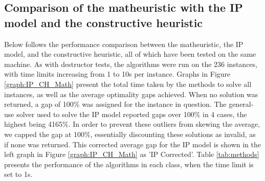 \documentclass[preprint,11pt,3p]{elsarticle}
\begin{document}
\subsection{Comparison of the matheuristic with the IP model and the constructive heuristic}
Below follows the performance comparison between the matheuristic, the IP model, and the constructive heuristic, all of which have been tested on the same machine. As with destructor tests, the algorithms were run on the 236 instances, with time limits increasing from 1 to 10s per instance. Graphs in Figure \ref{graph:IP_CH_Math} present the total time taken by the methods to solve all instances, as well as the average optimality gaps achieved. When no solution was returned, a gap of 100\% was assigned for the instance in question. The general-use solver used to solve the IP model reported gaps over 100\% in 4 cases, the highest being 4165\%. In order to prevent these outliers from skewing the average, we capped the gap at 100\%, essentially discounting these solutions as invalid, as if none was returned. This corrected average gap for the IP model is shown in the left graph in Figure \ref{graph:IP_CH_Math} as 'IP Corrected'. Table \ref{tab:methods} presents the performance of the algorithms in each class, when the time limit is set to 1s.
\end{document}
